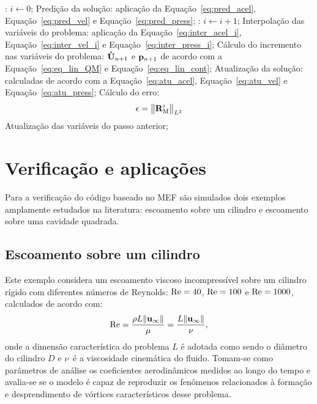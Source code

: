 \begin{algorithm}
	\caption{Algoritmo para problemas da DFC}
	\label{alg:fluid}
	\begin{algorithmic}[1]
		:
		\State $i \gets 0$;
		\State Predição da solução: aplicação da Equação~\eqref{eq:pred_acel}, Equação~\eqref{eq:pred_vel} e Equação~\eqref{eq:pred_press};
		:
		\State $i \gets i+1$;
		\State Interpolação das variáveis do problema: aplicação da Equação~\eqref{eq:inter_acel_i}, Equação~\eqref{eq:inter_vel_i} e Equação~\eqref{eq:inter_press_i};
		\State Cálculo do incremento nas variáveis do problema: $\mathbf{\dot{U}}_{n+1}$ e $\mathbf{p}_{n+1}$ de acordo com a Equação~\eqref{eq:eq_lin_QM} e Equação~\eqref{eq:eq_lin_cont};
		\State Atualização da solução: calculadas de acordo com a Equação~\eqref{eq:atu_acel}, Equação~\eqref{eq:atu_vel} e Equação~\eqref{eq:atu_press};
		\State Cálculo do erro:
		\begin{align}
		\epsilon =\left\| \mathbf{R}_\mathrm{M}^i \right\|_{L^2}
		\end{align}
		\EndWhile
		\State Atualização das variáveis do passo anterior;
		\EndFor
	\end{algorithmic}
\end{algorithm}

\section{Verificação e aplicações} \label{capitulo:Cap2:VerApl}

Para a verificação do código baseado no MEF são simulados dois exemplos amplamente estudados na literatura: escoamento sobre um cilindro e escoamento sobre uma cavidade quadrada.

\subsection{Escoamento sobre um cilindro} \label{capitulo:Cap2:VerApl:Cilindo}

Este exemplo considera um escoamento viscoso incompressível sobre um cilindro rígido com diferentes números de Reynolds: $\mathrm{Re} = 40$, $\mathrm{Re} = 100$ e $\mathrm{Re} = 1000$, calculados de acordo com:
\begin{align}
	\mathrm{Re} = \frac{\rho L \lVert\mathbf{u}_{\infty}\lVert}{\mu} = \frac{L \lVert \mathbf{u}_{\infty} \lVert}{\nu}, \label{eq:Reynolds}
\end{align}
\noindent onde a dimensão característica do problema $L$ é adotada como sendo o diâmetro do cilindro $D$ e $\nu$ é a viscosidade cinemática do fluido. Tomam-se como parâmetros de análise os coeficientes aerodinâmicos medidos ao longo do tempo e avalia-se se o modelo é capaz de reproduzir os fenômenos relacionados à formação e desprendimento de vórtices característicos desse problema. 

